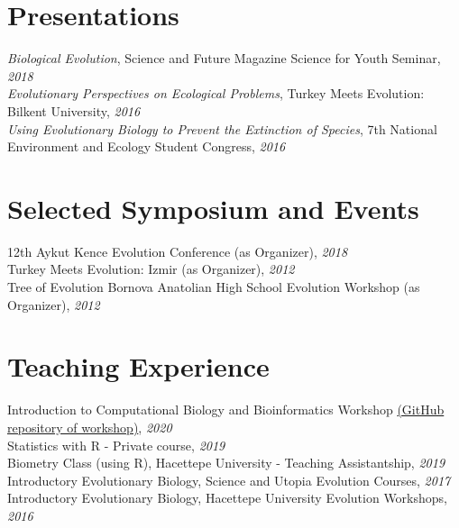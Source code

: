 \documentclass[letterpaper,11pt]{article}
\begin{document}
\section{Presentations}
{\textit{Biological Evolution}}, Science and Future Magazine Science for Youth Seminar,  \textit{2018} \\
{\textit{Evolutionary Perspectives on Ecological Problems}}, Turkey Meets Evolution: Bilkent University,  \textit{2016} \\
{\textit{Using Evolutionary Biology to Prevent the Extinction of
Species}}, 7th National Environment and Ecology Student Congress,  \textit{2016}

\section{Selected Symposium and Events}
12th Aykut Kence Evolution Conference (as Organizer), \textit{2018} \\
Turkey Meets Evolution: Izmir (as Organizer), \textit{2012} \\
Tree of Evolution Bornova Anatolian High School Evolution Workshop (as Organizer), \textit{2012} \\

\section{Teaching Experience}
Introduction to Computational Biology and Bioinformatics Workshop \href{https://github.com/isinaltinkaya/Hesaplamali_Biyoloji_ve_Biyoinformatige_Giris_2020}{(GitHub repository of workshop)}, \textit{2020}\\
Statistics with R - Private course, \textit{2019} \\
Biometry Class (using R), Hacettepe University - Teaching Assistantship, \textit{2019} \\
Introductory Evolutionary Biology, Science and Utopia Evolution Courses, \textit{2017} \\
Introductory Evolutionary Biology, Hacettepe University Evolution Workshops, \textit{2016} \\


\end{document}
